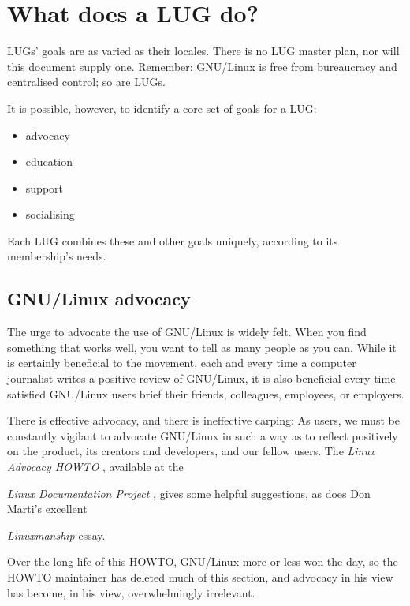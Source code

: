 
\section{What does a LUG do?}

LUGs' goals are as varied as their locales.  There is no LUG master
plan, nor will this document supply one. Remember: GNU/Linux is free from
bureaucracy and centralised control; so are LUGs.

It is possible, however, to identify a core set of goals for a 
LUG:

\begin{itemize}
\item advocacy
\item education
\item support
\item socialising
\end{itemize}


Each LUG combines these and other goals uniquely, according to its
membership's needs.




\subsection{GNU/Linux advocacy}

The urge to advocate the use of GNU/Linux is widely felt.  When you find
something that works well, you want to tell as many people as you can.
While it is certainly beneficial to the movement, each and every time a
computer journalist writes a positive review of GNU/Linux, it is also
beneficial every time satisfied GNU/Linux users brief their friends,
colleagues, employees, or employers.

There is effective advocacy, and there is ineffective carping: As 
users, we must be constantly vigilant to advocate GNU/Linux in such a way as
to reflect positively on the product, its creators and developers, and
our fellow users.  The 
\emph{Linux Advocacy HOWTO} \texttt{\ackurl}
, available at the 

\emph{Linux Documentation Project} \texttt{\aclurl}
, 
gives some helpful suggestions, as does Don Marti's excellent 

\emph{Linuxmanship} \texttt{\acmurl}
 essay.

Over the long life of this HOWTO, GNU/Linux more or less won the 
day, so the HOWTO maintainer has deleted much of this section, and 
advocacy in his view has become, in his view, overwhelmingly irrelevant.




